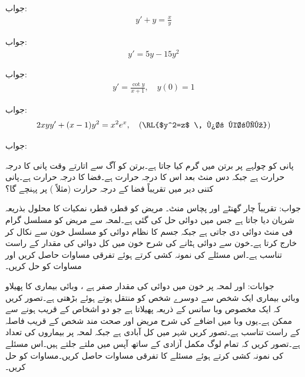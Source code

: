 جواب:
\begin{align*}
y'+y=\frac{x}{y}
\end{align*}

جواب:
\begin{align*}
y'=5y-15y^2
\end{align*}

جواب:
\begin{align*}
y'=\frac{\cot y}{x+1},\quad y(0)=1
\end{align*}

جواب:
\begin{align*}
2xyy'+(x-1)y^2=x^2e^x,\quad (\text{\RL{$y^2=z$ \, پر کریں}})
\end{align*}

جواب:

پانی کو چولہے پر برتن میں گرم کیا جاتا ہے۔برتن کو آگ سے اتارتے وقت پانی کا درجہ حرارت  ہے جبکہ دس منٹ بعد اس کا درجہ حرارت  ہے۔فضا کا درجہ حرارت  ہے۔پانی کتنی دیر میں تقریباً فضا کے درجہ حرارت (مثلاً ) پر پہنچے گا؟

جواب: تقریباً چار گھنٹے اور پچاس منٹ۔
مریض کو قطرہ قطرہ نمکیات کا محلول بذریعہ شریان دیا جاتا ہے جس میں دوائی حل کی گئی ہے۔لمحہ  سے مریض کو مسلسل  گرام فی منٹ دوائی دی جاتی ہے جبکہ جسم کا نظام دوائی کو مسلسل خون سے نکال کر خارج کرتا ہے۔خون سے دوائی ہٹانے کی شرح خون میں کل دوائی کی مقدار کے راست تناسب ہے۔اس مسئلے کی نمونہ کشی کرتے ہوئے  تفرقی مساوات حاصل کریں اور مساوات کو حل کریں۔

جوابات: اور لمحہ  پر خون میں دوائی کی مقدار صفر ہے ، 
\quad وبائی بیماری کا پھیلاو\\
وبائی بیماری ایک شخص سے دوسرے شخص کو منتقل ہوتے ہوئے بڑھتی ہے۔تصور کریں کہ ایک مخصوص وبا  سانس کے ذریعہ پھیلاتا  ہے جو دو اشخاص کے قریب ہونے سے ممکن ہے۔یوں وبا میں اضافے کی شرح مریض اور صحت مند شخص کے قریب فاصلہ کے راست تناسب ہے۔تصور کریں شہر میں کل آبادی  ہے جبکہ لمحہ  پر بیماروں کی تعداد  ہے۔تصور کریں کہ تمام لوگ مکمل آزادی کے ساتھ آپس میں ملتے جلتے ہیں۔اس مسئلے کی نمونہ کشی کرتے ہوئے مسئلے کا تفرقی مساوات حاصل کریں۔مساوات کو حل کریں۔
 
